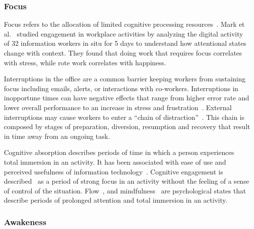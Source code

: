 
\vspace{-8mm}

\subsubsection{Focus}

Focus refers to the allocation of limited cognitive processing resources~\cite{Anderson04}.
Mark et al.~\cite{mark2014bored} studied engagement in workplace activities by analyzing the digital activity of 32 information workers in situ for 5 days to understand how attentional states change with context.  They found that doing work that requires focus correlates with stress, while rote work correlates with happiness.

Interruptions in the office are a common barrier keeping workers from sustaining focus including emails, alerts, or interactions with co-workers\cite{gonzalez2004constant,chong2006interruptions,shamsi07}. Interruptions in inopportune times can have negative effects that range from higher error rate and lower overall performance
to an increase in stress and frustration~\cite{bailey2001effects,czerwinski2000instant,mark2008cost}.
External interruptions may cause workers to enter a ``chain of distraction''~\cite{shamsi07}.
This chain is composed by stages of preparation, diversion, resumption and recovery that result in time away from an ongoing task. 

Cognitive absorption describes periods of time in which a person experiences total immersion in an activity.
It has been associated with ease of use and perceived usefulness of information technology~\cite{agarwal00}.
Cognitive engagement is described~\cite{webster97} as a period of strong focus in an activity without the feeling of a sense of control of the situation. Flow~\cite{Csikszentmihalyi90}, and mindfulness~\cite{Weick06,dane11} are psychological states that describe periods of prolonged attention and total immersion in an activity. 

\vspace{-8mm}

\subsubsection{Awakeness}

